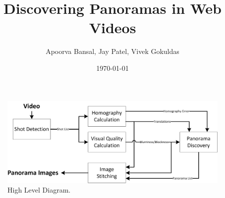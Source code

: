 \documentclass[10pt]{article}
\author{Apoorva Bansal, Jay Patel, Vivek Gokuldas}
\title{Discovering Panoramas in Web Videos}
\date{\today}
\begin{document}
\maketitle





\begin{multicols}{2}

\end{multicols}

\begin{figure}[t] 
  \centering
  \includegraphics[scale=1.2]{HLD.png}  
  \caption{High Level Diagram.} \label{fig:HLD}
\end{figure}

\begin{multicols}{2}





\end{multicols}
\end{document}

